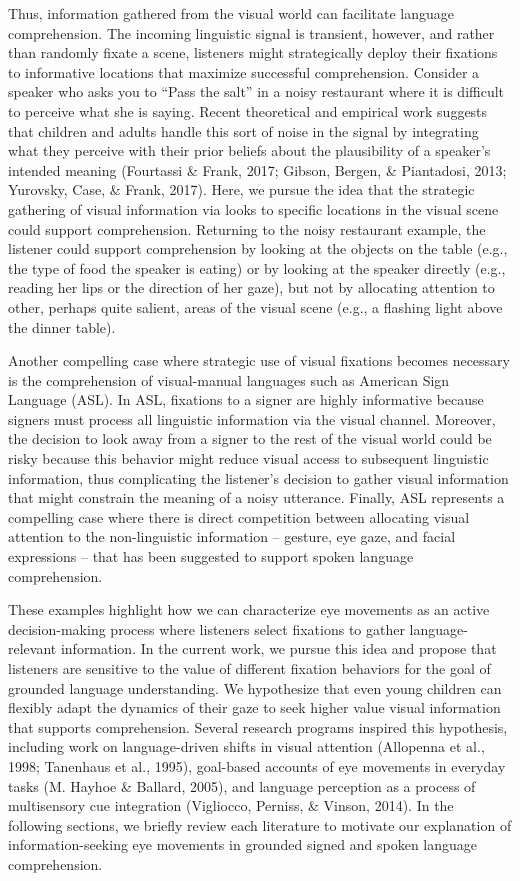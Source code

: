 \documentclass[,man,floatsintext]{apa6}
\begin{document}
Thus, information gathered from the visual world can facilitate language
comprehension. The incoming linguistic signal is transient, however, and
rather than randomly fixate a scene, listeners might strategically
deploy their fixations to informative locations that maximize successful
comprehension. Consider a speaker who asks you to \enquote{Pass the
salt} in a noisy restaurant where it is difficult to perceive what she
is saying. Recent theoretical and empirical work suggests that children
and adults handle this sort of noise in the signal by integrating what
they perceive with their prior beliefs about the plausibility of a
speaker's intended meaning (Fourtassi \& Frank, 2017; Gibson, Bergen, \&
Piantadosi, 2013; Yurovsky, Case, \& Frank, 2017). Here, we pursue the
idea that the strategic gathering of visual information via looks to
specific locations in the visual scene could support comprehension.
Returning to the noisy restaurant example, the listener could support
comprehension by looking at the objects on the table (e.g., the type of
food the speaker is eating) or by looking at the speaker directly (e.g.,
reading her lips or the direction of her gaze), but not by allocating
attention to other, perhaps quite salient, areas of the visual scene
(e.g., a flashing light above the dinner table).

Another compelling case where strategic use of visual fixations becomes
necessary is the comprehension of visual-manual languages such as
American Sign Language (ASL). In ASL, fixations to a signer are highly
informative because signers must process all linguistic information via
the visual channel. Moreover, the decision to look away from a signer to
the rest of the visual world could be risky because this behavior might
reduce visual access to subsequent linguistic information, thus
complicating the listener's decision to gather visual information that
might constrain the meaning of a noisy utterance. Finally, ASL
represents a compelling case where there is direct competition between
allocating visual attention to the non-linguistic information --
gesture, eye gaze, and facial expressions -- that has been suggested to
support spoken language comprehension.

These examples highlight how we can characterize eye movements as an
active decision-making process where listeners select fixations to
gather language-relevant information. In the current work, we pursue
this idea and propose that listeners are sensitive to the value of
different fixation behaviors for the goal of grounded language
understanding. We hypothesize that even young children can flexibly
adapt the dynamics of their gaze to seek higher value visual information
that supports comprehension. Several research programs inspired this
hypothesis, including work on language-driven shifts in visual attention
(Allopenna et al., 1998; Tanenhaus et al., 1995), goal-based accounts of
eye movements in everyday tasks (M. Hayhoe \& Ballard, 2005), and
language perception as a process of multisensory cue integration
(Vigliocco, Perniss, \& Vinson, 2014). In the following sections, we
briefly review each literature to motivate our explanation of
information-seeking eye movements in grounded signed and spoken language
comprehension.
\end{document}
